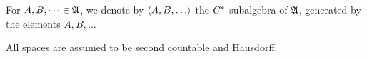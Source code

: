 % 
% 

For $A, B, \dots \in \mathfrak{A}$, we denote by $\gen{A, B, \dots}$ the
$C^{*}$-subalgebra of $\mathfrak{A}$, generated by the elements $A, B, \dots$

All spaces are assumed to be second countable and Hausdorff. 




% 
% 

 
















